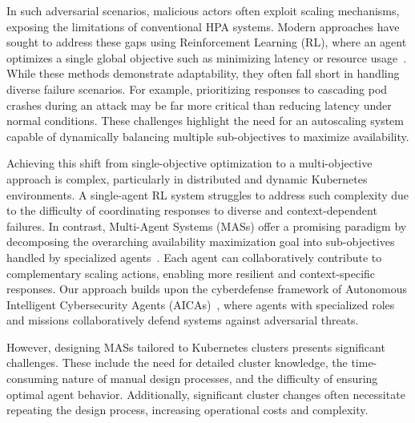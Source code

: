 \documentclass[conference]{IEEEtran}
\begin{document}
In such adversarial scenarios, malicious actors often exploit scaling mechanisms, exposing the limitations of conventional HPA systems. Modern approaches have sought to address these gaps using Reinforcement Learning (RL), where an agent optimizes a single global objective such as minimizing latency or resource usage~\cite{SingleObjectiveScaling, RLAutoscalingSurvey}. While these methods demonstrate adaptability, they often fall short in handling diverse failure scenarios. For example, prioritizing responses to cascading pod crashes during an attack may be far more critical than reducing latency under normal conditions. These challenges highlight the need for an autoscaling system capable of dynamically balancing multiple sub-objectives to maximize availability.

Achieving this shift from single-objective optimization to a multi-objective approach is complex, particularly in distributed and dynamic Kubernetes environments. A single-agent RL system struggles to address such complexity due to the difficulty of coordinating responses to diverse and context-dependent failures. In contrast, Multi-Agent Systems (MASs) offer a promising paradigm by decomposing the overarching availability maximization goal into sub-objectives handled by specialized agents~\cite{MultiObjectiveMAS}. Each agent can collaboratively contribute to complementary scaling actions, enabling more resilient and context-specific responses. Our approach builds upon the cyberdefense framework of Autonomous Intelligent Cybersecurity Agents (AICAs)~\cite{kott2018autonomous}, where agents with specialized roles and missions collaboratively defend systems against adversarial threats.

However, designing MASs tailored to Kubernetes clusters presents significant challenges. These include the need for detailed cluster knowledge, the time-consuming nature of manual design processes, and the difficulty of ensuring optimal agent behavior. Additionally, significant cluster changes often necessitate repeating the design process, increasing operational costs and complexity.
\end{document}
